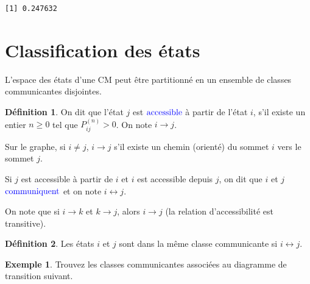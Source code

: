 \documentclass[
]{book}
\newenvironment{Shaded}{\begin{snugshade}}{\end{snugshade}}
\newcommand{\CommentTok}[1]{\textcolor[rgb]{0.56,0.35,0.01}{\textit{#1}}}
\newcommand{\KeywordTok}[1]{\textcolor[rgb]{0.13,0.29,0.53}{\textbf{#1}}}
\newcommand{\NormalTok}[1]{#1}
\newcommand{\OperatorTok}[1]{\textcolor[rgb]{0.81,0.36,0.00}{\textbf{#1}}}
\theoremstyle{definition}
\newtheorem{definition}{Définition}[chapter]
\theoremstyle{definition}
\newtheorem{example}{Exemple}[chapter]
\theoremstyle{definition}
\theoremstyle{remark}
\begin{document}
\begin{Shaded}
\end{Shaded}

\begin{verbatim}
[1] 0.247632
\end{verbatim}

\hypertarget{classification-des-uxe9tats}{%
\section{Classification des états}\label{classification-des-uxe9tats}}

L'espace des états d'une CM peut être partitionné en un ensemble de classes communicantes disjointes.

\begin{definition}
\protect\hypertarget{def:unnamed-chunk-59}{}{\label{def:unnamed-chunk-59} }On dit que l'état \(j\) est \(\color{blue}{\mathbf{\text{accessible}}}\) à partir de l'état \(i\), s'il existe un entier \(n \geq 0\) tel que \(P^{(n)}_{ij} >0\). On note \(i \longrightarrow j\).

Sur le graphe, si \(i \neq j\), \(i\longrightarrow j\) s'il existe un chemin (orienté) du sommet \(i\) vers le sommet \(j\).

Si \(j\) est accessible à partir de \(i\) et \(i\) est accessible depuis \(j\), on dit que \(i\) et \(j\) \(\color{blue}{\mathbf{\text{communiquent}}}\) et on note \(i \longleftrightarrow j\).
\end{definition}

On note que si \(i \longrightarrow k\) et \(k \longrightarrow j\), alors \(i \longrightarrow j\) (la relation d'accessibilité est transitive).

\begin{definition}
\protect\hypertarget{def:unnamed-chunk-60}{}{\label{def:unnamed-chunk-60} }Les états \(i\) et \(j\) sont dans la même classe communicante si \(i \longleftrightarrow j\).
\end{definition}

\begin{example}
\protect\hypertarget{exm:unnamed-chunk-61}{}{\label{exm:unnamed-chunk-61} }Trouvez les classes communicantes associées au diagramme de transition suivant.
\end{example}
\end{document}
